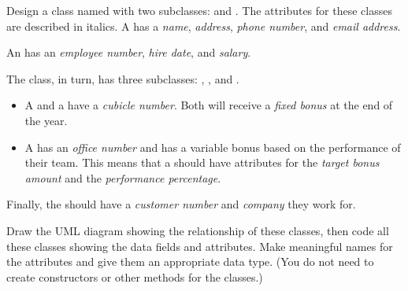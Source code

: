 \begin{exercise}
Design a class named  with two subclasses:  and . The attributes for these classes are described in italics. A  has a {\em name}, {\em address}, {\em phone number}, and  {\em email address}.

An  has an {\em employee number}, {\em hire date}, and {\em salary}.

The  class, in turn, has three subclasses: , , and . 
\begin{itemize}
\item A  and a  have a {\em cubicle number}. Both will receive a {\em fixed bonus} at the end of the year.
\item A  has an {\em office number} and has a variable bonus based on the performance of their team. This means that a  should have attributes for the {\em target bonus amount} and the {\em performance percentage}.
\end{itemize}

Finally, the  should have a {\em customer number} and {\em company} they work for.

Draw the UML diagram showing the relationship of these classes, then code all these classes showing the data fields and attributes. Make meaningful names for the attributes and give them an appropriate data type. (You do not need to create constructors or other methods for the classes.)
\end{exercise}

